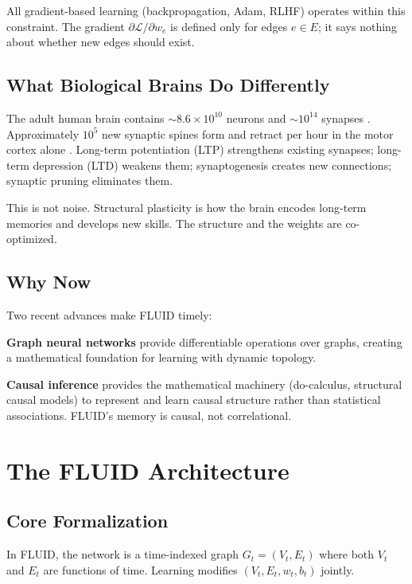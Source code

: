 \documentclass[12pt]{article}
\begin{document}
All gradient-based learning (backpropagation, Adam, RLHF) operates within this constraint. The gradient $\partial \mathcal{L} / \partial w_e$ is defined only for edges $e \in E$; it says nothing about whether new edges should exist.

\subsection{What Biological Brains Do Differently}

The adult human brain contains $\sim$$8.6 \times 10^{10}$ neurons and $\sim$$10^{14}$ synapses \cite{azevedo2009}. Approximately $10^5$ new synaptic spines form and retract per hour in the motor cortex alone \cite{bhatt2009}. Long-term potentiation (LTP) strengthens existing synapses; long-term depression (LTD) weakens them; synaptogenesis creates new connections; synaptic pruning eliminates them.

This is not noise. Structural plasticity is how the brain encodes long-term memories and develops new skills. The structure and the weights are co-optimized.

\subsection{Why Now}

Two recent advances make FLUID timely:

\textbf{Graph neural networks} \cite{scarselli2009} provide differentiable operations over graphs, creating a mathematical foundation for learning with dynamic topology.

\textbf{Causal inference} \cite{pearl2009} provides the mathematical machinery (do-calculus, structural causal models) to represent and learn causal structure rather than statistical associations. FLUID's memory is causal, not correlational.

\section{The FLUID Architecture}

\subsection{Core Formalization}

In FLUID, the network is a time-indexed graph $G_t = (V_t, E_t)$ where both $V_t$ and $E_t$ are functions of time. Learning modifies $(V_t, E_t, w_t, b_t)$ jointly.
\end{document}
